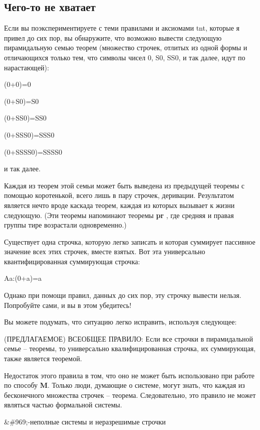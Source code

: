 \documentclass[../main.tex]{subfiles}
\begin{document}
\subsection{Чего-то не хватает}

Если вы поэкспериментируете с теми правилами и аксиомами \acs{tnt}, которые я привел до сих пор, вы обнаружите, что возможно вывести следующую пирамидальную семью теорем (множество строчек, отлитых из одной формы и отличающихся только тем, что символы чисел 0, S0, SS0, и так далее, идут по нарастающей):

(0+0)=0

(0+S0)=S0

(0+SS0)=SS0

(0+SSS0)=SSS0

(0+SSSS0)=SSSS0

и так далее.

Каждая из теорем этой семьи может быть выведена из предыдущей теоремы с помощью коротенькой, всего лишь в пару строчек, деривации. Результатом является нечто вроде каскада теорем, каждая из которых вызывает к жизни следующую. (Эти теоремы напоминают теоремы \textbf{pr} , где средняя и правая группы тире возрастали одновременно.)

Существует одна строчка, которую легко записать и которая суммирует пассивное значение всех этих строчек, вместе взятых. Вот эта универсально квантифицированная суммирующая строчка:

Aa:(0+a)=a

Однако при помощи правил, данных до сих пор, эту строчку вывести нельзя. Попробуйте сами, и вы в этом убедитесь!

Вы можете подумать, что ситуацию легко исправить, используя следующее:

(ПРЕДЛАГАЕМОЕ) ВСЕОБЩЕЕ ПРАВИЛО: Если все строчки в пирамидальной семье \--- теоремы, то универсально квалифицированная строчка, их суммирующая, также является теоремой.

Недостаток этого правила в том, что оно не может быть использовано при работе по способу \textbf{M}. Только люди, думающие о системе, могут знать, что каждая из бесконечного множества строчек \--- теорема. Следовательно, это правило не может являться частью формальной системы.

\&\#969;-неполные системы и неразрешимые строчки
\end{document}
